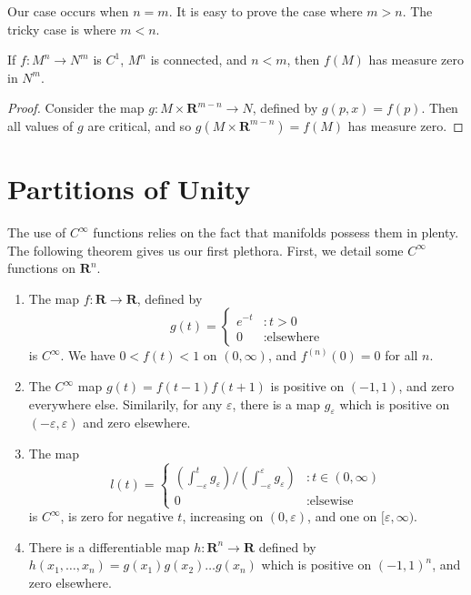 Our case occurs when $n = m$. It is easy to prove the case where $m > n$. The tricky case is where $m < n$.

\begin{theorem}
    If $f:M^n \to N^m$ is $C^1$, $M^n$ is connected, and $n < m$, then $f(M)$ has measure zero in $N^m$.
\end{theorem}
\begin{proof}
    Consider the map $g: M \times \mathbf{R}^{m-n} \to N$, defined by $g(p,x) = f(p)$. Then all values of $g$ are critical, and so $g(M \times \mathbf{R}^{m-n}) = f(M)$ has measure zero.
\end{proof}

\section{Partitions of Unity}

The use of $C^\infty$ functions relies on the fact that manifolds possess them in plenty. The following theorem gives us our first plethora. First, we detail some $C^\infty$ functions on $\mathbf{R}^n$.

\begin{enumerate}
    \item The map $f:\mathbf{R} \to \mathbf{R}$, defined by
    \[
    g(t) =
    \begin{cases}
        e^{-t} & : t > 0\\
        0 & : \text{elsewhere}
    \end{cases}
    \]
    is $C^\infty$. We have $0 < f(t) < 1$ on $(0,\infty)$, and $f^{(n)}(0) = 0$ for all $n$.
    \item The $C^\infty$ map $g(t) = f(t-1)f(t+1)$ is positive on $(-1,1)$, and zero everywhere else. Similarily, for any $\varepsilon$, there is a map $g_\varepsilon$ which is positive on $(-\varepsilon, \varepsilon)$ and zero elsewhere.
    \item The map 
    \[ l(t) = \begin{cases}
        \left(\int_{-\varepsilon}^t g_\varepsilon \right)/\left(\int_{-\varepsilon}^\varepsilon g_\varepsilon \right) & : t \in (0, \infty) \\
        0 & : \text{elsewise}
    \end{cases} \]
    is $C^\infty$, is zero for negative $t$, increasing on $(0, \varepsilon)$, and one on $[\varepsilon, \infty)$.
    \item There is a differentiable map $h:\mathbf{R}^n \to \mathbf{R}$ defined by $h(x_1, \dots, x_n) = g(x_1) g(x_2) \dots g(x_n)$ which is positive on $(-1, 1)^n$, and zero elsewhere.
\end{enumerate}

